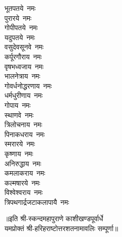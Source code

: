 \begin{multicols}{2}
\begin{flushleft}
भूतपतये~नमः\\
पुरारये~नमः\\
गोपीपतये~नमः\hfill{}\\
यदुपतये~नमः\\
वसुदेवसूनवे~नमः\\
कर्पूरगौराय~नमः\\
वृषभध्वजाय~नमः\\
भालनेत्राय~नमः\\
गोवर्धनोद्धरणाय~नमः\\
धर्मधुरीणाय~नमः\\
गोपाय~नमः\\
स्थाणवे~नमः\\
त्रिलोचनाय~नमः\hfill{}\\
पिनाकधराय~नमः\\
स्मरारये~नमः\\
कृष्णाय~नमः\\
अनिरुद्धाय~नमः\\
कमलाकराय~नमः\\
कल्मषारये~नमः\\
विश्वेश्वराय~नमः\\
त्रिपथगार्द्रजटाकलापायै~नमः\\
\end{flushleft}
\end{multicols}
॥इति श्री-स्कन्दमहापुराणे काशीखण्डपूर्वार्धे\\यमप्रोक्तं श्री-हरिहराष्टोत्तरशतनामावलिः सम्पूर्णा॥
